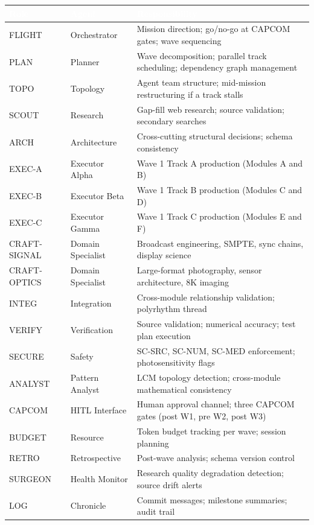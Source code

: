 \documentclass[11pt,letterpaper]{article}
\newcommand{\tableheader}[1]{\textbf{\sffamily\textcolor{white}{#1}}}
\begin{document}
\begin{center}
\begin{tabularx}{\textwidth}{L{2cm}L{3cm}X}
\toprule
{}
\tableheader{Role} & \tableheader{Agent} & \tableheader{Responsibility} \\
\midrule
FLIGHT & Orchestrator & Mission direction; go/no-go at CAPCOM gates; wave sequencing \\
PLAN & Planner & Wave decomposition; parallel track scheduling; dependency graph management \\
TOPO & Topology & Agent team structure; mid-mission restructuring if a track stalls \\
SCOUT & Research & Gap-fill web research; source validation; secondary searches \\
ARCH & Architecture & Cross-cutting structural decisions; schema consistency \\
EXEC-A & Executor Alpha & Wave 1 Track A production (Modules A and B) \\
EXEC-B & Executor Beta & Wave 1 Track B production (Modules C and D) \\
EXEC-C & Executor Gamma & Wave 1 Track C production (Modules E and F) \\
CRAFT-SIGNAL & Domain Specialist & Broadcast engineering, SMPTE, sync chains, display science \\
CRAFT-OPTICS & Domain Specialist & Large-format photography, sensor architecture, 8K imaging \\
INTEG & Integration & Cross-module relationship validation; polyrhythm thread \\
VERIFY & Verification & Source validation; numerical accuracy; test plan execution \\
SECURE & Safety & SC-SRC, SC-NUM, SC-MED enforcement; photosensitivity flags \\
ANALYST & Pattern Analyst & LCM topology detection; cross-module mathematical consistency \\
CAPCOM & HITL Interface & Human approval channel; three CAPCOM gates (post W1, pre W2, post W3) \\
BUDGET & Resource & Token budget tracking per wave; session planning \\
RETRO & Retrospective & Post-wave analysis; schema version control \\
SURGEON & Health Monitor & Research quality degradation detection; source drift alerts \\
LOG & Chronicle & Commit messages; milestone summaries; audit trail \\
\bottomrule
\end{tabularx}
\end{center}
\end{document}
